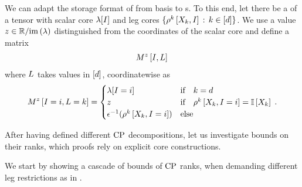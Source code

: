 \begin{remark}
    \label{rem:matStorageBasPlus}
    We can adapt the storage format of  from basis to \basplusDecomposition{}s.
    To this end, let there be a \basplusDecomposition{} of a tensor with scalar core $\lambda[I]$ and leg cores $\{\rho^{k}\left[X_{k},I\right] \,:\, k\in[d]\}$.
    We use a value $z\in\mathbb{R}/\mathrm{im}\left(\lambda\right)$ distinguished from the coordinates of the scalar core and define a matrix
    \begin{align*}
        M^{z}\left[I,L\right] \,
    \end{align*}
    where $L$ takes values in $[d]$, coordinatewise as
    \begin{align*}
        M^{z}\left[I=i,L=k\right] =
        \begin{cases}
            \lambda[I=i] & \text{if} \quad k = d \\
            z & \text{if} \quad \rho^{k}\left[X_{k},I=i\right] = \mathbb{I}\left[X_{k}\right] \\
            \epsilon^{-1}(\rho^{k}\left[X_{k},I=i\right]) & \text{else}
        \end{cases} \, .
    \end{align*}
\end{remark}




After having defined different $\mathrm{CP}$ decompositions, let us investigate bounds on their ranks, which proofs rely on explicit core constructions.




We start by showing a cascade of bounds of $\mathrm{CP}$ ranks, when demanding different leg restrictions as in .

